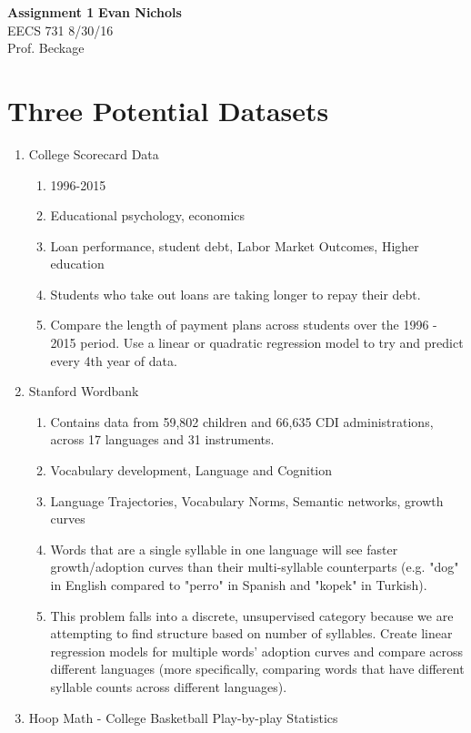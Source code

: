 \documentclass[11pt]{article}
\begin{document}
\noindent
\large\textbf{Assignment 1} \hfill \textbf{Evan Nichols} \\
\normalsize EECS 731 \hfill 8/30/16 \\ 
Prof. Beckage \hfill \\

\section*{Three Potential Datasets}

\begin{enumerate}
	\item College Scorecard Data
		\begin{enumerate}
			\item 1996-2015
			\item Educational psychology, economics
			\item Loan performance, student debt, Labor Market Outcomes, Higher education
			\item Students who take out loans are taking longer to repay their debt.
			\item Compare the length of payment plans across students over the 1996 - 2015 period. Use a linear or quadratic regression model to try and predict every 4th year of data.
		\end{enumerate}
	\item Stanford Wordbank
		\begin{enumerate}
			\item Contains data from 59,802 children and 66,635 CDI administrations, across 17 languages and 31 instruments.
			\item Vocabulary development, Language and Cognition
			\item Language Trajectories, Vocabulary Norms, Semantic networks, growth curves
			\item Words that are a single syllable in one language will see faster growth/adoption curves than their multi-syllable counterparts (e.g. "dog" in English compared to "perro" in Spanish and "kopek" in Turkish).
			\item This problem falls into a discrete, unsupervised category because we are attempting to find structure based on number of syllables. Create linear regression models for multiple words' adoption curves and compare across different languages (more specifically, comparing words that have different syllable counts across different languages). 
		\end{enumerate}
	\item Hoop Math - College Basketball Play-by-play Statistics

\end{enumerate}
\end{document}
